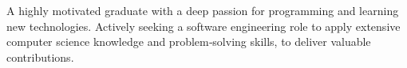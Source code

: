 

\begin{cvparagraph}

A highly motivated graduate with a deep passion for programming and learning new technologies. Actively seeking a software engineering role to apply extensive computer science knowledge and problem‐solving skills, to deliver valuable contributions.

\end{cvparagraph}
